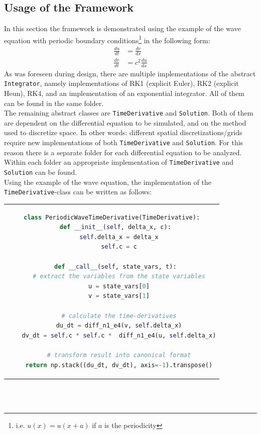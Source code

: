 \subsection{Usage of the Framework}
In this section the framework is demonstrated using the example of the wave equation with periodic boundary conditions\footnote{i.e. $u(x)=u(x+a)$ if $a$ is the periodicity} in the following form:
\begin{align*}
\frac{du}{dt} &= \frac{dv}{dx}\\
\frac{dv}{dt} &= c^2\frac{du}{dx}
\end{align*}
As was foreseen during design, there are multiple implementations of the abstract \texttt{Integrator}, namely implementations of RK1 (explicit Euler), RK2 (explicit Heun), RK4, and an implementation of an exponential integrator.
All of them can be found in the same folder.
\\
The remaining abstract classes are \texttt{TimeDerivative} and \texttt{Solution}.
Both of them are dependent on the differential equation to be simulated, and on the method used to discretize space.
In other words: different spatial discretizations/grids require new implementations of both \texttt{TimeDerivative} and \texttt{Solution}.
For this reason there is a separate folder for each differential equation to be analyzed.
Within each folder an appropriate implementation of \texttt{TimeDerivative} and \texttt{Solution} can be found.
\\
Using the example of the wave equation, the implementation of the \texttt{TimeDerivative}-class can be written as follows:\\
\begin{tabular}{c}
\begin{lstlisting}[language=Python]
class PeriodicWaveTimeDerivative(TimeDerivative):
  def __init__(self, delta_x, c):
    self.delta_x = delta_x
    self.c = c

  def __call__(self, state_vars, t):
    # extract the variables from the state variables
    u = state_vars[0]
    v = state_vars[1]
			
    # calculate the time-derivatives
    du_dt = diff_n1_e4(v, self.delta_x)
    dv_dt = self.c * self.c *  diff_n1_e4(u, self.delta_x)
        	
    # transform result into canonical format
    return np.stack((du_dt, dv_dt), axis=-1).transpose()
\end{lstlisting}
\end{tabular}
\\\\
